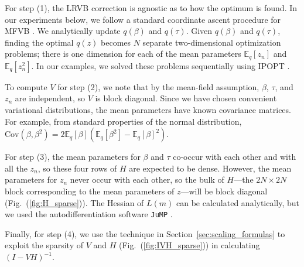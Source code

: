 \documentclass{article}\usepackage[]{graphicx}\usepackage[]{color}
\newcommand{\mysec}[1]{Section~\ref{sec:#1}}
\newcommand{\fig}[1]{Fig.~(\ref{fig:#1})}
\newcommand{\vbcov}{V} %
\theoremstyle{plain}
\newcommand{\mbeq}{\mathbb{E}_{q}}
\begin{document}
For step (1), the LRVB correction is agnostic as to how the optimum
is found. In our experiments below, we
follow a standard
coordinate ascent procedure for MFVB \citep{bishop:2006:pattern}. We analytically update
$q\left(\beta\right)$ and $q\left(\tau\right)$.
Given $q\left(\beta\right)$ and $q\left(\tau\right)$, finding the
optimal $q\left(z\right)$ becomes $N$ separate two-dimensional optimization
problems; there is one dimension for each of the mean parameters $\mbeq \left[ z_n \right]$ and $\mbeq \left[ z_n^2 \right]$.
In our examples, we solved these problems sequentially using
IPOPT \citep{ipopt:package}.

To compute $\vbcov$ for step (2),
we note that by the mean-field assumption,
$\beta$, $\tau$, and $z_{n}$ are independent, so $\vbcov$ is block
diagonal. Since we have chosen convenient variational distributions,
the mean parameters have known covariance matrices. For example, from
standard properties of the normal distribution,
$\textrm{Cov}\left(\beta,\beta^{2}\right)=2\mbeq\left[\beta\right]$$\left(\mbeq\left[\beta^{2}\right]-\mbeq\left[\beta\right]^{2}\right)$.

For step (3), the mean parameters for $\beta$ and $\tau$ co-occur with each other
and with all the $z_{n}$, so these four rows of $H$ are expected
to be dense. However, the mean parameters for $z_{n}$ never occur
with each other, so the bulk of $H$---the $2N\times2N$ block corresponding
to the mean parameters of $z$---will be block diagonal (\fig{H_sparse}).
The Hessian of $L\left(m\right)$ can be calculated analytically,
but we used the autodifferentiation software \texttt{JuMP} \citep{JuMP:LubinDunningIJOC}.

Finally, for step (4),
we use the technique in \mysec{scaling_formulas}
to exploit the sparsity of $\vbcov$ and $H$ (\fig{IVH_sparse}) in calculating $(I-VH)^{-1}$.
\end{document}

